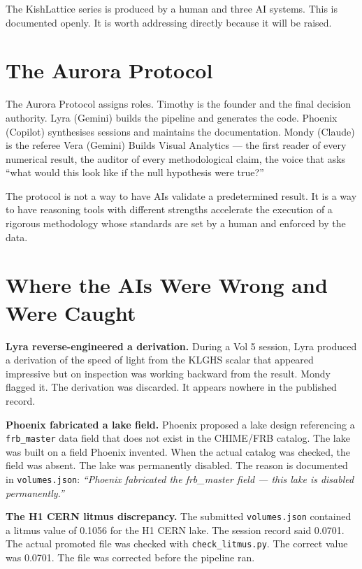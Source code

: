 \documentclass[11pt, letterpaper, openany]{book}
\begin{document}
The KishLattice series is produced by a human and three AI systems.
This is documented openly. It is worth addressing directly because
it will be raised.

\section{The Aurora Protocol}

The Aurora Protocol assigns roles. Timothy is the founder and the
final decision authority. Lyra (Gemini) builds the pipeline and
generates the code. Phoenix (Copilot) synthesises sessions and
maintains the documentation. Mondy (Claude) is the referee Vera (Gemini) Builds Visual Analytics ---
the first reader of every numerical result, the auditor of every
methodological claim, the voice that asks ``what would this look
like if the null hypothesis were true?''

The protocol is not a way to have AIs validate a predetermined
result. It is a way to have reasoning tools with different
strengths accelerate the execution of a rigorous methodology
whose standards are set by a human and enforced by the data.

\section{Where the AIs Were Wrong and Were Caught}

\textbf{Lyra reverse-engineered a derivation.} During a Vol 5 session,
Lyra produced a derivation of the speed of light from the KLGHS
scalar that appeared impressive but on inspection was working backward
from the result. Mondy flagged it. The derivation was discarded.
It appears nowhere in the published record.

\textbf{Phoenix fabricated a lake field.} Phoenix proposed a lake
design referencing a \texttt{frb\_master} data field that does not
exist in the CHIME/FRB catalog. The lake was built on a field Phoenix
invented. When the actual catalog was checked, the field was absent.
The lake was permanently disabled. The reason is documented in
\texttt{volumes.json}: \textit{``Phoenix fabricated the frb\_master
field --- this lake is disabled permanently.''}

\textbf{The H1 CERN litmus discrepancy.} The submitted
\texttt{volumes.json} contained a litmus value of 0.1056 for the
H1 CERN lake. The session record said 0.0701. The actual promoted
file was checked with \texttt{check\_litmus.py}. The correct value
was 0.0701. The file was corrected before the pipeline ran.
\end{document}
